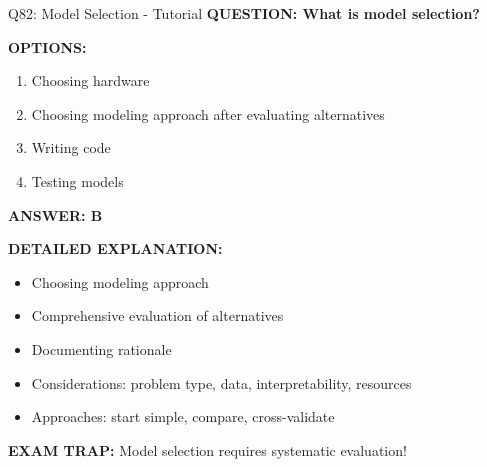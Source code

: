 \documentclass[8pt]{beamer}
\begin{document}
	\begin{frame}{Q82: Model Selection - Tutorial}
		\fontsize{6.5}{7.5}\selectfont
		\textbf{QUESTION: What is model selection?}
		
		\vspace{0.1cm}
		\textbf{OPTIONS:}
		\begin{enumerate}
			\item Choosing hardware
			\item Choosing modeling approach after evaluating alternatives
			\item Writing code
			\item Testing models
		\end{enumerate}
		
		\vspace{0.1cm}
		\textcolor{myblue}{\textbf{ANSWER: B}}
		
		\vspace{0.1cm}
		\textbf{DETAILED EXPLANATION:}
		\begin{itemize}
			\item Choosing modeling approach
			\item Comprehensive evaluation of alternatives
			\item Documenting rationale
			\item Considerations: problem type, data, interpretability, resources
			\item Approaches: start simple, compare, cross-validate
		\end{itemize}
		
		\vspace{0.1cm}
		\textcolor{myred}{\textbf{EXAM TRAP:}} Model selection requires \textcolor{myblue}{systematic evaluation}!
	\end{frame}
	
\end{document}
